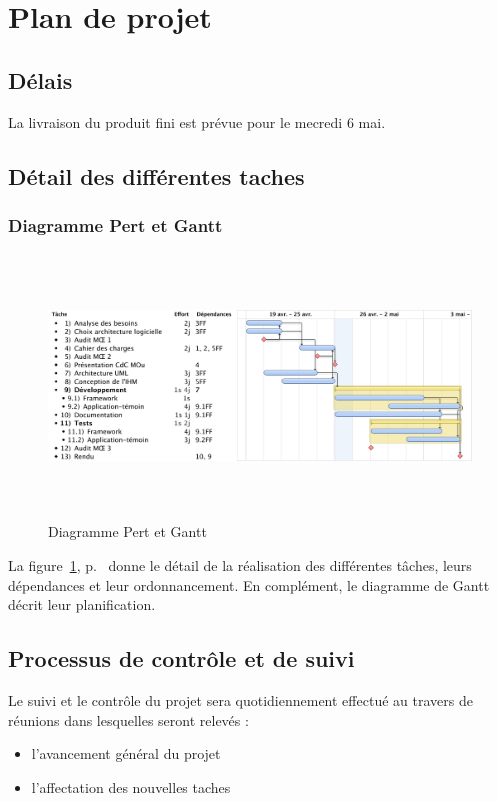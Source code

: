 
\section{Plan de projet}
\subsection{Délais}
La livraison du produit fini est prévue pour le mecredi 6 mai.

\subsection{Détail des différentes taches}
\subsubsection{Diagramme Pert et Gantt}
\begin{figure}[thbp]
	\centering
		\includegraphics[height=7cm,angle=90]{../diagrammes/planification.pdf}
	\caption{Diagramme Pert et Gantt}
	\label{fig:pert}
\end{figure}
La figure~\ref{fig:pert}, p.~\pageref{fig:pert} donne le détail de la réalisation des différentes tâches, leurs dépendances et leur ordonnancement. En complément, le diagramme de Gantt décrit leur planification.

\subsection{Processus de contrôle et de suivi}

Le suivi et le contrôle du projet sera quotidiennement effectué au travers de réunions dans lesquelles seront relevés : 
\begin{itemize}
 \item l'avancement général du projet
 \item l'affectation des nouvelles taches
\end{itemize}

